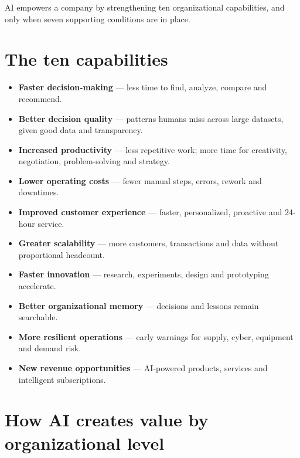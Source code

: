 
AI empowers a company by strengthening ten organizational capabilities, and
only when seven supporting conditions are in place.

\section{The ten capabilities}

\begin{itemize}
  \item \textbf{Faster decision-making} — less time to find, analyze, compare
        and recommend.
  \item \textbf{Better decision quality} — patterns humans miss across large
        datasets, given good data and transparency.
  \item \textbf{Increased productivity} — less repetitive work; more time for
        creativity, negotiation, problem-solving and strategy.
  \item \textbf{Lower operating costs} — fewer manual steps, errors, rework
        and downtimes.
  \item \textbf{Improved customer experience} — faster, personalized,
        proactive and 24-hour service.
  \item \textbf{Greater scalability} — more customers, transactions and data
        without proportional headcount.
  \item \textbf{Faster innovation} — research, experiments, design and
        prototyping accelerate.
  \item \textbf{Better organizational memory} — decisions and lessons remain
        searchable.
  \item \textbf{More resilient operations} — early warnings for supply,
        cyber, equipment and demand risk.
  \item \textbf{New revenue opportunities} — AI-powered products, services
        and intelligent subscriptions.
\end{itemize}

\section{How AI creates value by organizational level}

